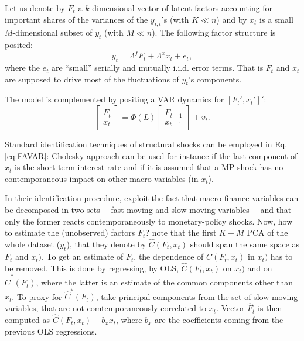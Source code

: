 \documentclass[
  12pt,
]{book}
\theoremstyle{definition}
\theoremstyle{definition}
\theoremstyle{definition}
\theoremstyle{definition}
\theoremstyle{remark}
\begin{document}
Let us denote by \(F_t\) a \(k\)-dimensional vector of latent factors accounting for important shares of the variances of the \(y_{i,t}\)'s (with \(K \ll n\)) and by \(x_t\) is a small \(M\)-dimensional subset of \(y_t\) (with \(M \ll n\)). The following factor structure is posited:
\[
y_t = \Lambda^f F_t + \Lambda^x x_t + e_t,
\]
where the \(e_t\) are ``small'' serially and mutually i.i.d. error terms. That is \(F_t\) and \(x_t\) are supposed to drive most of the fluctuations of \(y_t\)'s components.

The model is complemented by positing a VAR dynamics for \([F_t',x_t']'\):
\begin{equation}
\left[\begin{array}{c}F_t\\x_t\end{array}\right] = \Phi(L)\left[\begin{array}{c}F_{t-1}\\ x_{t-1}\end{array}\right] + v_t.\label{eq:FAVAR}
\end{equation}

Standard identification techniques of structural shocks can be employed in Eq. \eqref{eq:FAVAR}: Cholesky approach can be used for instance if the last component of \(x_t\) is the short-term interest rate and if it is assumed that a MP shock has no contemporaneous impact on other macro-variables (in \(x_t\)).

In their identification procedure, \citet{Bernanke_Boivin_Eliasz_2005} exploit the fact that macro-finance variables can be decomposed in two sets ---fast-moving and slow-moving variables--- and that only the former reacts contemporaneously to monetary-policy shocks. Now, how to estimate the (unobserved) factors \(F_t\)? \citet{Bernanke_Boivin_Eliasz_2005} note that the first \(K+M\) PCA of the whole dataset (\(y_t\)), that they denote by \(\hat{C}(F_t,x_t)\) should span the same space as \(F_t\) and \(x_t)\). To get an estimate of \(F_t\), the dependence of \(\hat{C}(F_t,x_t)\) in \(x_t)\) has to be removed. This is done by regressing, by OLS, \(\hat{C}(F_t,x_t)\) on \(x_t)\) and on \(\hat{C}^*(F_t)\), where the latter is an estimate of the common components other than \(x_t\). To proxy for \(\hat{C}^*(F_t)\), \citet{Bernanke_Boivin_Eliasz_2005} take principal components from the set of slow-moving variables, that are not comtemporaneously correlated to \(x_t\). Vector \(\hat{F}_t\) is then computed as \(\hat{C}(F_t,x_t) - b_x x_t\), where \(b_x\) are the coefficients coming from the previous OLS regressions.
\end{document}
